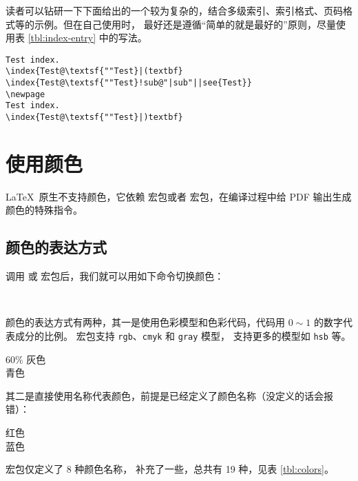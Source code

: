 读者可以钻研一下下面给出的一个较为复杂的，结合多级索引、索引格式、页码格式等的示例。但在自己使用时，
最好还是遵循“简单的就是最好的”原则，尽量使用表 \ref{tbl:index-entry} 中的写法。
\begin{verbatim}
Test index.
\index{Test@\textsf{""Test}|(textbf}
\index{Test@\textsf{""Test}!sub@"|sub"||see{Test}}
\newpage
Test index.
\index{Test@\textsf{""Test}|)textbf}
\end{verbatim}

\section{使用颜色}\label{sec:color}

\LaTeX\ 原生不支持颜色，它依赖  宏包或者  宏包，在编译过程中给 PDF 输出生成颜色的特殊指令。

\subsection{颜色的表达方式}

调用  或  宏包后，我们就可以用如下命令切换颜色：
\begin{command}
 \\
\end{command}

颜色的表达方式有两种，其一是使用色彩模型和色彩代码，代码用 $0\sim1$ 的数字代表成分的比例。
 宏包支持 \texttt{rgb}、\texttt{cmyk} 和 \texttt{gray} 模型， 支持更多的模型如 \texttt{hsb} 等。
\begin{example}
\large\sffamily
{\color[gray]{0.6} 
  60\% 灰色} \\
{\color[rgb]{0,1,1} 
  青色} 
\end{example}

其二是直接使用名称代表颜色，前提是已经定义了颜色名称（没定义的话会报错）：
\begin{example}
\large\sffamily
{\color{red} 红色} \\
{\color{blue} 蓝色} 
\end{example}

 宏包仅定义了 8 种颜色名称， 补充了一些，总共有 19 种，见表 \ref{tbl:colors}。

\def\showcolor#1{%
  \texttt{#1}\index{yanse@颜色!#1@\texttt{#1}}%
  \ \begingroup\fboxsep=0pt\fbox{{\color{#1}\vrule width 1.2em height 1.4ex}}\endgroup}
\def\showxcolor#1{%
  \texttt{#1}\index{yanse@颜色!#1@\texttt{#1} (\pkg{xcolor})}%
  \ \begingroup\fboxsep=0pt\fbox{{\color{#1}\vrule width 1.2em height 1.4ex}}\endgroup}

